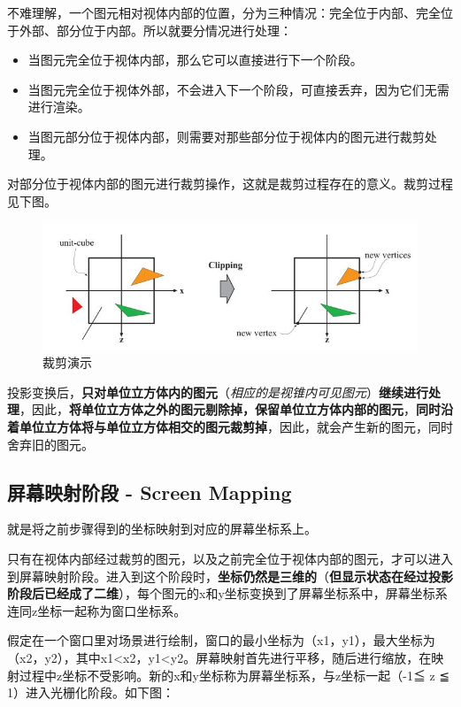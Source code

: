 \documentclass[UTF8,a4paper,12pt]{ctexbook}
\begin{document}
			不难理解，一个图元相对视体内部的位置，分为三种情况：完全位于内部、完全位于外部、部分位于内部。所以就要分情况进行处理：
				\begin{itemize}
					\item 当图元完全位于视体内部，那么它可以直接进行下一个阶段。
					\item 当图元完全位于视体外部，不会进入下一个阶段，可直接丢弃，因为它们无需进行渲染。
					\item 当图元部分位于视体内部，则需要对那些部分位于视体内的图元进行裁剪处理。				
				\end{itemize}
			
			对部分位于视体内部的图元进行裁剪操作，这就是裁剪过程存在的意义。裁剪过程见下图。
				
				\begin{figure}[H]
					\centering
					\includegraphics[scale=0.57]{clip}
					\caption{裁剪演示}
				\end{figure}
			
			投影变换后，\textbf{只对单位立方体内的图元}（\textit{相应的是视锥内可见图元}）\textbf{继续进行处理}，因此，\textbf{将单位立方体之外的图元剔除掉，保留单位立方体内部的图元}，\textbf{同时沿着单位立方体将与单位立方体相交的图元裁剪掉}，因此，就会产生新的图元，同时舍弃旧的图元。
			
		\subsection{屏幕映射阶段 - Screen Mapping} 
			就是将之前步骤得到的坐标映射到对应的屏幕坐标系上。
		
			只有在视体内部经过裁剪的图元，以及之前完全位于视体内部的图元，才可以进入到屏幕映射阶段。进入到这个阶段时，\textbf{坐标仍然是三维的}（\textbf{但显示状态在经过投影阶段后已经成了二维}），每个图元的x和y坐标变换到了屏幕坐标系中，屏幕坐标系连同z坐标一起称为窗口坐标系。
			
			假定在一个窗口里对场景进行绘制，窗口的最小坐标为（x1，y1），最大坐标为（x2，y2），其中x1<x2，y1<y2。屏幕映射首先进行平移，随后进行缩放，在映射过程中z坐标不受影响。新的x和y坐标称为屏幕坐标系，与z坐标一起（-1≦ z ≦ 1）进入光栅化阶段。如下图：
			
\end{document}
